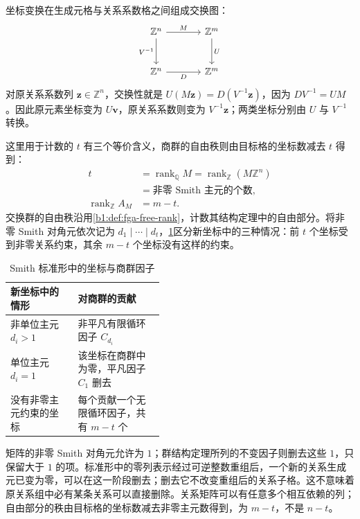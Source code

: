 \ProseParagraphBreak
坐标变换在生成元格与关系系数格之间组成交换图：
\[
	\begin{tikzcd}[row sep=large, column sep=large]
		\mathbb Z^n \arrow[r, "M"] \arrow[d, "V^{-1}"'] & \mathbb Z^m \arrow[d, "U"] \\
		\mathbb Z^n \arrow[r, "D"'] & \mathbb Z^m
	\end{tikzcd}
\]
对原关系系数列 \(\mathbf z\in\mathbb Z^n\)，交换性就是 \(U(M\mathbf z)=D(V^{-1}\mathbf z)\)，因为 \(DV^{-1}=UM\)。因此原元素坐标变为 \(U\mathbf v\)，原关系系数则变为 \(V^{-1}\mathbf z\)；两类坐标分别由 \(U\) 与 \(V^{-1}\) 转换。

\ProseParagraphBreak
这里用于计数的 \(t\) 有三个等价含义，商群的自由秩则由目标格的坐标数减去 \(t\) 得到：
\[
	\begin{aligned}
		t&=\operatorname{rank}_{\mathbb Q}M =\operatorname{rank}_{\mathbb Z}(M\mathbb Z^n)\\
		&=\text{非零 Smith 主元的个数},\\
		\operatorname{rank}_{\mathbb Z}A_M&=m-t.
	\end{aligned}
\]
交换群的自由秩沿用\cref{b1:def:fga-free-rank}，计数其结构定理中的自由部分。将非零 Smith 对角元依次记为 \(d_1\mid\cdots\mid d_t\)，\cref{b1:tab:smith-coordinate-types}区分新坐标中的三种情况：前 \(t\) 个坐标受到非零关系约束，其余 \(m-t\) 个坐标没有这样的约束。

\begin{table}[htbp]
	\centering
	\caption{Smith 标准形中的坐标与商群因子}
	\label{b1:tab:smith-coordinate-types}
	\begin{tabularx}{\linewidth}{@{}>{\raggedright\arraybackslash}p{0.44\linewidth}>{\raggedright\arraybackslash}X@{}}
		\toprule
		新坐标中的情形 & 对商群的贡献 \\
		\midrule
		非单位主元 \(d_i>1\) & 非平凡有限循环因子 \(C_{d_i}\) \\
		单位主元 \(d_i=1\) & 该坐标在商群中为零，平凡因子 \(C_1\) 删去 \\
		没有非零主元约束的坐标 & 每个贡献一个无限循环因子，共有 \(m-t\) 个 \\
		\bottomrule
	\end{tabularx}
\end{table}

矩阵的非零 Smith 对角元允许为 \(1\)；群结构定理所列的不变因子则删去这些 \(1\)，只保留大于 \(1\) 的项。标准形中的零列表示经过可逆整数重组后，一个新的关系生成元已变为零，可以在这一阶段删去；删去它不改变重组后的关系子格。这不意味着原关系组中必有某条关系可以直接删除。关系矩阵可以有任意多个相互依赖的列；自由部分的秩由目标格的坐标数减去非零主元数得到，为 \(m-t\)，不是 \(n-t\)。

